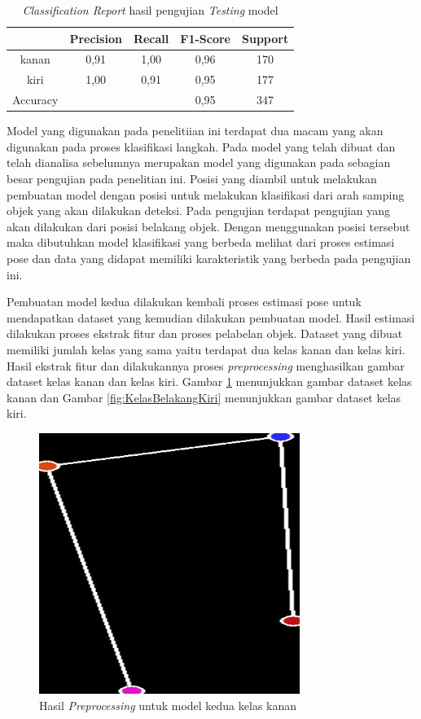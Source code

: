 \begin{longtable}{|c|c|c|c|c|}
  \caption{\emph{Classification Report} hasil pengujian \emph{Testing} model}
  \label{tb:ClassificationReport}                                   \\
  \hline
  \rowcolor[HTML]{C0C0C0}
   & \textbf{Precision} & \textbf{Recall} & \textbf{F1-Score} & \textbf{Support} \\
  \hline
  kanan     & 0,91    & 1,00    & 0,96    & 170         \\
  \hline
  kiri      & 1,00    & 0,91    & 0,95    & 177           \\
  \hline
  Accuracy  &         &         & 0,95    & 347            \\
  \hline
\end{longtable}

Model yang digunakan pada penelitiian ini terdapat dua macam yang akan digunakan pada proses klasifikasi langkah. Pada model yang telah dibuat dan telah dianalisa sebelumnya merupakan model yang digunakan pada sebagian besar pengujian pada penelitian ini. Posisi yang diambil untuk melakukan pembuatan model dengan posisi untuk melakukan klasifikasi dari arah samping objek yang akan dilakukan deteksi. Pada pengujian terdapat pengujian yang akan dilakukan dari posisi belakang objek. Dengan menggunakan posisi tersebut maka dibutuhkan model klasifikasi yang berbeda melihat dari proses estimasi pose dan data yang didapat memiliki karakteristik yang berbeda pada pengujian ini. 

Pembuatan model kedua dilakukan kembali proses estimasi pose untuk mendapatkan dataset yang kemudian dilakukan pembuatan model. Hasil estimasi dilakukan proses ekstrak fitur dan proses pelabelan objek. Dataset yang dibuat memiliki jumlah kelas yang sama yaitu terdapat dua kelas kanan dan kelas kiri. Hasil ekstrak fitur dan dilakukannya proses \emph{preprocessing} menghasilkan gambar dataset kelas kanan dan kelas kiri. Gambar \ref{fig:KelasBelakangKanan} menunjukkan gambar dataset kelas kanan dan Gambar \ref{fig:KelasBelakangKiri} menunjukkan gambar dataset kelas kiri.

\begin{figure}[H]
  \centering
  \includegraphics[scale=0.45]{gambar/dataset belakang kanan.jpg}
  \caption{Hasil \emph{Preprocessing} untuk model kedua kelas kanan}
  \label{fig:KelasBelakangKanan}
\end{figure}


